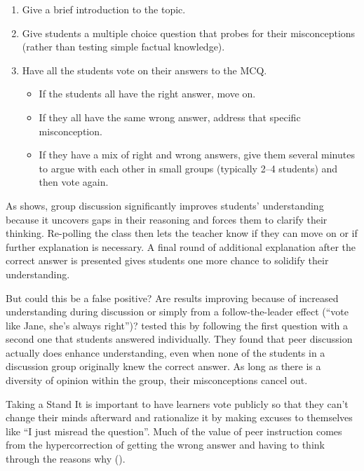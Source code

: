 \begin{enumerate}

\item
  Give a brief introduction to the topic.

\item
  Give students a multiple choice question that probes for their misconceptions
  (rather than testing simple factual knowledge).

\item
  Have all the students vote on their answers to the MCQ.

  \begin{itemize}

  \item
    If the students all have the right answer, move on.

  \item
    If they all have the same wrong answer,
    address that specific misconception.

  \item
    If they have a mix of right and wrong answers,
    give them several minutes to argue with each other
    in small groups (typically 2--4 students)
    and then vote again.

  \end{itemize}

\end{enumerate}

As
 shows,
group discussion significantly improves students' understanding
because it uncovers gaps in their reasoning and forces them to clarify their thinking.
Re-polling the class then lets the teacher know if they can move on
or if further explanation is necessary.
A final round of additional explanation after the correct answer is presented
gives students one more chance to solidify their understanding.

But could this be a false positive?
Are results improving because of increased understanding during discussion
or simply from a follow-the-leader effect (``vote like Jane, she's always right'')?
\cite{Smit2009} tested this by following the first question with a second one
that students answered individually.
They found that peer discussion actually does enhance understanding,
even when none of the students in a discussion group originally knew the correct answer.
As long as there is a diversity of opinion within the group,
their misconceptions cancel out.

\begin{aside}{Taking a Stand}
  It is important to have learners vote publicly
  so that they can't change their minds afterward and rationalize it
  by making excuses to themselves like ``I just misread the question''.
  Much of the value of peer instruction comes from the hypercorrection
  of getting the wrong answer
  and having to think through the reasons why
  ().
\end{aside}

